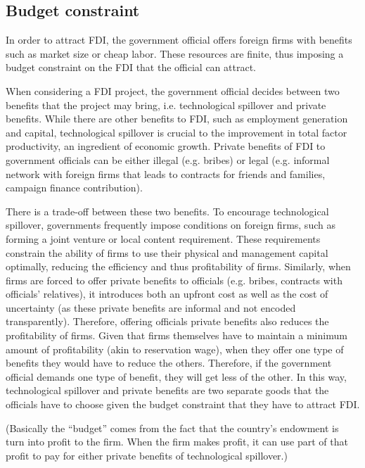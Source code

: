 \subsection{Budget constraint}

In order to attract FDI, the government official offers foreign firms with benefits such as market size or cheap labor. These resources are finite, thus imposing a budget constraint on the FDI that the official can attract.

When considering a FDI project, the government official decides between two benefits that the project may bring, i.e. technological spillover and private benefits. While there are other benefits to FDI, such as employment generation and capital, technological spillover is crucial to the improvement in total factor productivity, an ingredient of economic growth. Private benefits of FDI to government officials can be either illegal (e.g. bribes) or legal (e.g. informal network with foreign firms that leads to contracts for friends and families, campaign finance contribution).
 
There is a trade-off between these two benefits. To encourage technological spillover, governments frequently impose conditions on foreign firms, such as forming a joint venture or local content requirement. These requirements constrain the ability of firms to use their physical and management capital optimally, reducing the efficiency and thus profitability of firms. Similarly, when firms are forced to offer private benefits to officials (e.g. bribes, contracts with officials' relatives), it introduces both an upfront cost as well as the cost of uncertainty (as these private benefits are informal and not encoded transparently). Therefore, offering officials private benefits also reduces the profitability of firms. Given that firms themselves have to maintain a minimum amount of profitability (akin to reservation wage), when they offer one type of benefits they would have to reduce the others. Therefore, if the government official demands one type of benefit, they will get less of the other. In this way, technological spillover and private benefits are two separate goods that the officials have to choose given the budget constraint that they have to attract FDI.

(Basically the ``budget'' comes from the fact that the country's endowment is turn into profit to the firm. When the firm makes profit, it can use part of that profit to pay for either private benefits of technological spillover.)

